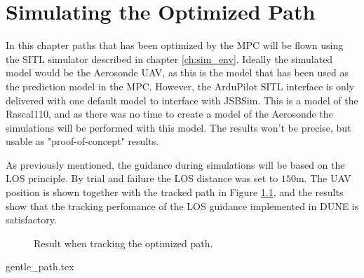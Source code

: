 \chapter{Simulating the Optimized Path}

In this chapter paths that has been optimized by the MPC will be flown using the SITL simulator described in chapter \ref{ch:sim_env}. Ideally the simulated model would be the Aerosonde UAV, as this is the model that has been used as the prediction model in the MPC. However, the ArduPilot SITL interface is only delivered with one default model to interface with JSBSim. This is a model of the Rascal110, and as there was no time to create a model of the Aerosonde the simulations will be performed with this model. The results won't be precise, but usable as "proof-of-concept" results.

As previously mentioned, the guidance during simulations will be based on the LOS principle. By trial and failure the LOS distance was set to $150$m. The UAV position is shown together with the tracked path in Figure \ref{fig:sim_tracking}, and the results show that the tracking perfomance of the LOS guidance implemented in DUNE is satisfactory.

\begin{figure}
	\caption{Result when tracking the optimized path.}
	\label{fig:sim_tracking}
\end{figure}

{gentle_path.tex}